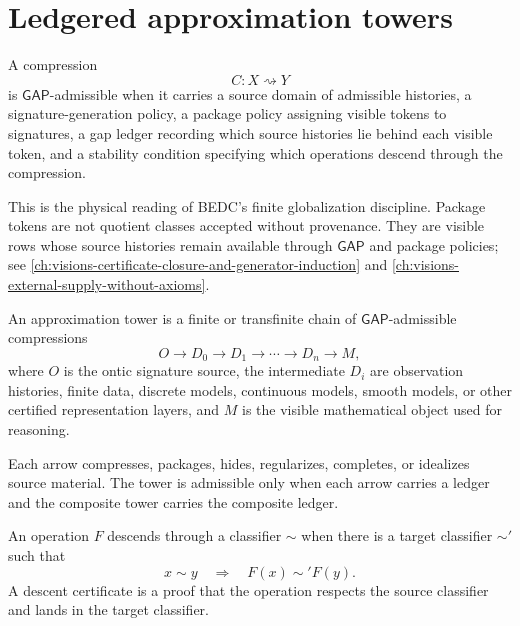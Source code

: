 \section{Ledgered approximation towers}
\label{sec:ledgered-approximation-towers}

\begin{definition}
\label{def:gap-admissible-compression}
A compression
$$
C:X\rightsquigarrow Y
$$
is $\mathsf{GAP}$-admissible when it carries a source domain of admissible histories, a signature-generation policy, a package policy assigning visible tokens to signatures, a gap ledger recording which source histories lie behind each visible token, and a stability condition specifying which operations descend through the compression.
\end{definition}

This is the physical reading of BEDC's finite globalization discipline. Package tokens are not quotient classes accepted without provenance. They are visible rows whose source histories remain available through $\mathsf{GAP}$ and package policies; see \autoref{ch:visions-certificate-closure-and-generator-induction} and \autoref{ch:visions-external-supply-without-axioms}.

\begin{definition}
\label{def:reality-constrained-approximation-tower}
An approximation tower is a finite or transfinite chain of $\mathsf{GAP}$-admissible compressions
$$
O
\longrightarrow
D_0
\longrightarrow
D_1
\longrightarrow
\cdots
\longrightarrow
D_n
\longrightarrow
M,
$$
where $O$ is the ontic signature source, the intermediate $D_i$ are observation histories, finite data, discrete models, continuous models, smooth models, or other certified representation layers, and $M$ is the visible mathematical object used for reasoning.
\end{definition}

Each arrow compresses, packages, hides, regularizes, completes, or idealizes source material. The tower is admissible only when each arrow carries a ledger and the composite tower carries the composite ledger.

\begin{definition}
\label{def:reality-constrained-operational-descent}
An operation $F$ descends through a classifier $\sim$ when there is a target classifier $\sim'$ such that
$$
x\sim y
\quad\Longrightarrow\quad
F(x)\sim'F(y).
$$
A descent certificate is a proof that the operation respects the source classifier and lands in the target classifier.
\end{definition}

